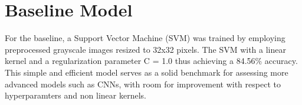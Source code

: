 \documentclass{article} %
\begin{document}
\section{Baseline Model}
For the baseline, a Support Vector Machine (SVM) was trained by employing preprocessed grayscale images resized to 32x32 pixels. The SVM with a linear kernel and a regularization parameter C = 1.0 thus achieving a 84.56\% accuracy. This simple and efficient model serves as a solid benchmark for assessing more advanced models such as CNNs, with room for improvement with respect to hyperparamters and non linear kernels. 




\end{document}
